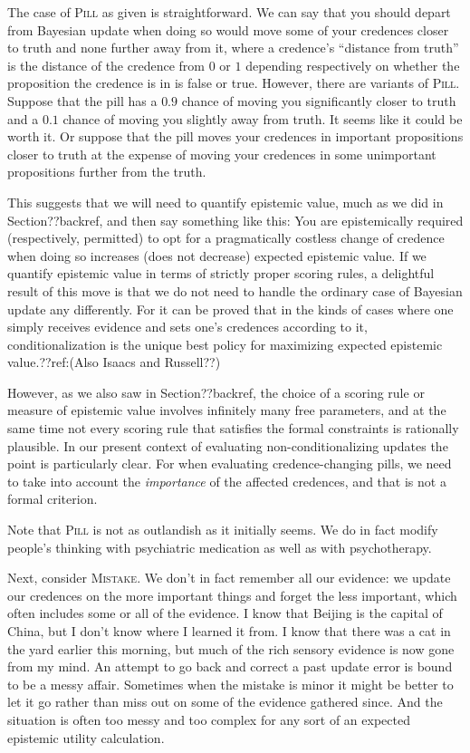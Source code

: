 The case of \textsc{Pill} as given is straightforward. We can say that you should depart from Bayesian update when doing so would move
some of your credences closer to truth and none further away from it, where a credence's ``distance from truth'' is the 
distance of the credence from $0$ or $1$ depending respectively on whether the proposition the credence is in is false or
true. However, there are variants of \textsc{Pill}. Suppose that the pill has a $0.9$ chance of moving you significantly
closer to truth and a $0.1$ chance of moving you slightly away from truth. It seems like it could be worth it. Or suppose
that the pill moves your credences in important propositions closer to truth at the expense of moving your credences in some
unimportant propositions further from the truth.

This suggests that we will need to quantify epistemic value, much as we did in Section??backref, and then say
something like this: You are epistemically required (respectively, permitted) to opt for a pragmatically costless change of 
credence when doing so increases (does not decrease) expected epistemic value. If we quantify epistemic value in terms of
strictly proper scoring rules, a delightful result of this move is that we do not need to handle the ordinary case of 
Bayesian update any differently. For it can be proved that in the kinds of cases where one simply receives
evidence and sets one's credences according to it, conditionalization is the unique best policy for maximizing expected
epistemic value.??ref:(Also Isaacs and Russell??) 

However, as we also saw in Section??backref, the choice of a scoring rule or measure of epistemic value involves infinitely
many free parameters, and at the same time not every scoring rule that satisfies the formal constraints is rationally
plausible. In our present context of evaluating non-conditionalizing updates the point is particularly clear. For when
evaluating credence-changing pills, we need to take into account the \textit{importance} of the affected credences, and
that is not a formal criterion. 

Note that \textsc{Pill} is not as outlandish as it initially seems. We do in fact modify people's thinking with
psychiatric medication as well as with psychotherapy.

Next, consider \textsc{Mistake}. We don't in fact remember all our evidence:
we update our credences on the more important things and forget the less important, which often includes some or
all of the evidence. I know that Beijing is the capital of China, but I don't know where I learned it from. I know that 
there was a cat in the yard earlier this morning, but much of the rich sensory evidence is now gone from my mind. 
An attempt to go back and correct a past update error is bound to be a messy affair. Sometimes when the mistake is minor
it might be better to let it go rather than miss out on some of the evidence gathered since. And the situation is often
too messy and too complex for any sort of an expected epistemic utility calculation. 

